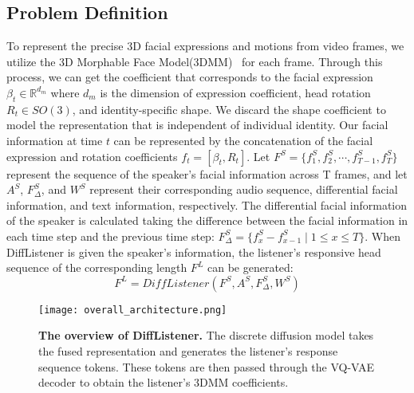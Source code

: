 \subsection{Problem Definition}
To represent the precise 3D facial expressions and motions from video frames, we utilize the 3D Morphable Face Model(3DMM)~\cite{blanz2023morphable, kittler20163d} for each frame. Through this process, we can get the coefficient that corresponds to the facial expression $\beta_t \in \mathbb{R}^{d_m}$ where $d_m$ is the dimension of expression coefficient, head rotation $R_t \in SO(3)$, and identity-specific shape\cite{zollhofer2018state}. We discard the shape coefficient to model the representation that is independent of individual identity\cite{ng2022learning}. 
Our facial information at time $t$ can be represented by the concatenation of the facial expression and rotation coefficients $f_t = [\beta_t, R_t]$.
Let $F^{S}=\{ f^{S}_1, f^{S}_2, \cdots,f^{S}_{T-1},f^{S}_T \}$ represent the sequence of the speaker's facial information across T frames, and let $A^{S}$, $F_\Delta^{S}$, and $W^{S}$ represent their corresponding audio sequence, differential facial information, and text information, respectively. 
The differential facial information of the speaker is calculated taking the difference between the facial information in each time step and the previous time step:
$F_\Delta^{S} = \{f^S_x-f^S_{x-1}\mid 1\leq x\leq T\}$.
When DiffListener is given the speaker's information, the listener's responsive head sequence of the corresponding length $F^{L}$ can be generated:
\begin{equation}
    F^{L} = DiffListener(F^{S},A^{S},F_\Delta^{S},W^{S})
\end{equation}

\begin{figure}[t]
\centering
\texttt{[image: overall\_architecture.png]}
    \caption{\textbf{The overview of DiffListener.} 
    The discrete diffusion model takes the fused representation and generates the listener's response sequence tokens. These tokens are then passed through the VQ-VAE decoder to obtain the listener's 3DMM coefficients.
    }
    \label{fig:Architecture overview}
\end{figure}
